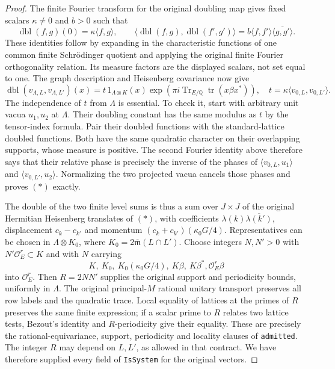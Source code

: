 \begin{proof}
The finite Fourier transform for the original doubling map gives
fixed scalars $\kappa\ne0$ and $b>0$ such that
\[
 \operatorname{dbl}(f,g)(0)=\kappa\langle f,g\rangle,
 \qquad
 \langle\operatorname{dbl}(f,g),\operatorname{dbl}(f',g')\rangle
       =b\langle f,f'\rangle\overline{\langle g,g'\rangle}.
\]
These identities follow by expanding in the characteristic functions
of one common finite Schr\"odinger quotient and applying the original
finite Fourier orthogonality relation. Its measure factors are the
displayed scalars, not set equal to one. The graph description and
Heisenberg covariance now give
\[
 \operatorname{dbl}(v_{\Lambda,L},v_{\Lambda,L'})(x)
   =t\,1_{\Lambda\otimes K}(x)
         \exp\!\left(\pi i\operatorname{Tr}_{E/\mathbb Q}
                                      \operatorname{tr}(x\beta x^*)\right),
 \quad t=\kappa\langle v_{0,L},v_{0,L'}\rangle.             \tag{*}
\]
The independence of $t$ from $\Lambda$ is essential. To check it,
start with arbitrary unit vacua $u_1,u_2$ at $\Lambda$. Their
doubling constant has the same modulus as $t$ by the tensor-index
formula. Pair their doubled functions with the standard-lattice
doubled functions. Both have the same quadratic character on
their overlapping supports, whose measure is positive. The second
Fourier identity above therefore says that their relative phase
is precisely the inverse of the phases of
$\langle v_{0,L},u_1\rangle$ and
$\langle v_{0,L'},u_2\rangle$. Normalizing the two projected
vacua cancels those phases and proves $(*)$ exactly.

The double of the two finite level sums is thus a sum over
$J\times J$ of the original Hermitian Heisenberg translates of
$(*)$, with coefficients $\lambda(k)\overline{\lambda(k')}$,
displacement $c_k-c_{k'}$ and momentum
$(c_k+c_{k'})(\kappa_0G/4)$. Representatives can be chosen in
$\Lambda\otimes K_0$, where
$K_0=2\overline{\mathfrak m}(L\cap L')$.
Choose integers $N,N'>0$ with $N'\mathcal O_E^r\subset K$
and with $N$ carrying
\[
 K,\ K_0,\ K_0(\kappa_0G/4),\ K\beta,\ K\beta^*,
                         \mathcal O_E^r\beta
\]
into $\mathcal O_E^r$. Then $R=2NN'$ supplies the original
support and periodicity bounds, uniformly in $\Lambda$.
The original principal-$M$ rational unitary transport preserves
all row labels and the quadratic trace. Local equality of
lattices at the primes of $R$ preserves the same finite expression;
if a scalar prime to $R$ relates two lattice tests, Bezout's identity
and $R$-periodicity give their equality. These are precisely the
rational-equivariance, support, periodicity and locality clauses
of \texttt{admitted}. The integer $R$ may depend on $L,L'$,
as allowed in that contract. We have therefore supplied every
field of \texttt{IsSystem} for the original vectors.
\end{proof}

